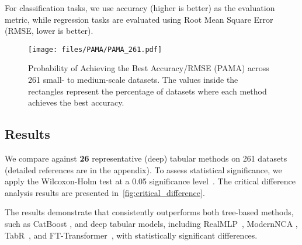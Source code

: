 For classification tasks, we use accuracy (higher is better) as the evaluation metric, while regression tasks are evaluated using Root Mean Square Error (RMSE, lower is better).

\begin{figure}[t]
    \centering
                    \vspace{-2mm}
    \texttt{[image: files/PAMA/PAMA\_261.pdf]}
        \vspace{-8mm}
    \caption{Probability of Achieving the Best Accuracy/RMSE (PAMA) across 261 small- to medium-scale datasets. The values inside the rectangles represent the percentage of datasets where each method achieves the best accuracy.
    }
    \vspace{-2mm}
    \label{fig:pama}
\end{figure}
\subsection{Results}

We compare \ours against \textbf{26} representative (deep) tabular methods on 261 datasets (detailed references are in the appendix). To assess statistical significance, we apply the Wilcoxon-Holm test at a 0.05 significance level~\citep{Demsar06Statistical}. The critical difference analysis results are presented in~\autoref{fig:critical_difference}.

The results demonstrate that \ours consistently outperforms both tree-based methods, such as CatBoost \cite{Prokhorenkova2018Catboost}, and deep tabular models, including RealMLP~\cite{David2024RealMLP}, ModernNCA \cite{Ye2024ModernNCA}, TabR~\cite{gorishniy2023tabr}, and FT-Transformer~\cite{GorishniyRKB21Revisiting}, with statistically significant differences. 


